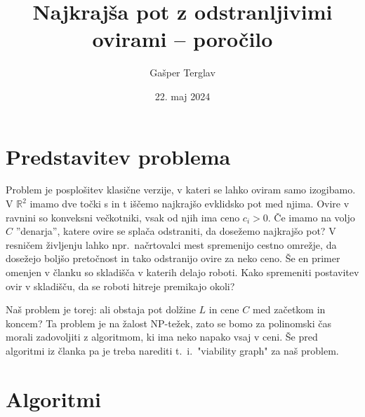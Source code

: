 \documentclass{article}
\author{Gašper Terglav}
\date{22. maj 2024}
\title{Najkrajša pot z odstranljivimi ovirami --  poročilo}
\begin{document}
\maketitle


\section*{Predstavitev problema}

Problem je posplošitev klasične verzije, v kateri se lahko oviram samo izogibamo. V $\mathbb{R}^2$ imamo dve točki s in t iščemo najkrajšo evklidsko pot med njima. Ovire v ravnini so konveksni večkotniki, vsak od njih ima ceno $c_i > 0$. Če imamo na voljo $C$ ''denarja'', katere ovire se splača odstraniti, da dosežemo najkrajšo pot? V resničem življenju lahko npr.\ načrtovalci mest spremenijo cestno omrežje, da dosežejo boljšo pretočnost in tako odstranijo ovire za neko ceno. Še en primer omenjen v članku so skladišča v katerih delajo roboti. Kako spremeniti postavitev ovir v skladišču, da se roboti hitreje premikajo okoli? 

Naš problem je torej: ali obstaja pot dolžine $L$ in cene $C$ med začetkom in koncem? Ta problem je na žalost NP-težek, zato se bomo za polinomski čas morali zadovoljiti z algoritmom, ki ima neko napako vsaj v ceni. Še pred algoritmi iz članka pa je treba narediti t.~i.\ "viability graph" za naš problem.




\section*{Algoritmi}
\end{document}
